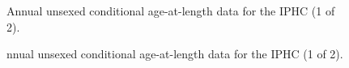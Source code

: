 \documentclass[
]{scrartcl}
\begin{document}
\begin{figure}


\caption{\label{fig-IPHC_agecomps1}Annual unsexed conditional
age-at-length data for the IPHC (1 of 2).}

\end{figure}%

\begin{figure}


\caption{\label{fig-IPHC_agecomps2}nnual unsexed conditional
age-at-length data for the IPHC (1 of 2).}

\end{figure}%
\end{document}
